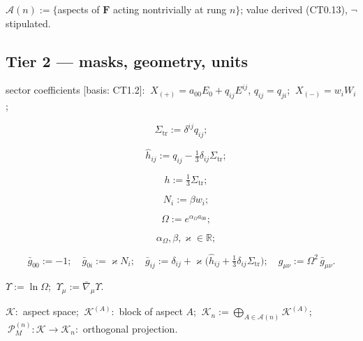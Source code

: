 \begin{definition}[{\texorpdfstring{D1.12}{D1.12}}]\label{tag:D1-12}
$\mathcal A(n):=\{$aspects of $\mathbf F$ acting nontrivially at rung $n\}$; value derived (CT0.13), $\neg$ stipulated.

\end{definition}

\subsection[Tier 2 — masks, geometry, units]{\texorpdfstring{Tier 2 — masks, geometry, units}{Tier 2 - masks, geometry, units}}

\begin{definition}[{\texorpdfstring{D2.1}{D2.1}}]\label{tag:D2-1}
sector coefficients [basis: CT1.2]: $\ X_{(+)}=a_{00}E_0+q_{ij}E^{ij}$, $q_{ij}=q_{ji}$; $\ X_{(-)}=w_iW_i$;

\[
\Sigma_{\mathrm{tr}}:=\delta^{ij}q_{ij};
\]

\[
\quad \hat h_{ij}:=q_{ij}-\tfrac13\delta_{ij}\Sigma_{\mathrm{tr}};
\]

\[
\quad h:=\tfrac13\Sigma_{\mathrm{tr}};
\]

\[
\quad N_i:=\beta w_i;
\]

\[
\quad \Omega:=e^{\alpha_\Omega a_{00}};
\]

\[
\quad \alpha_\Omega,\beta,\varkappa\in\mathbb R;
\]

\[
\bar g_{00}:=-1;\quad
\bar g_{0i}:=\varkappa N_i;\quad
\bar g_{ij}:=\delta_{ij}+\varkappa\bigl(\hat h_{ij}+\tfrac13\delta_{ij}\Sigma_{\mathrm{tr}}\bigr);\quad
g_{\mu\nu}:=\Omega^2\,\bar g_{\mu\nu}.
\]

\end{definition}

\begin{definition}[{\texorpdfstring{D2.2}{D2.2}}]\label{tag:D2-2}
$\Upsilon:=\ln\Omega$; $\ \Upsilon_\mu:=\bar\nabla_\mu\Upsilon$.

\end{definition}

\begin{definition}[{\texorpdfstring{D2.3}{D2.3}}]\label{tag:D2-3}
$\mathcal K:$ aspect space; $\ \mathcal K^{(A)}:$ block of aspect $A$; $\ \mathcal K_n:=\bigoplus_{A\in\mathcal A(n)}\mathcal K^{(A)}$; $\ \mathcal P_M^{(n)}:\mathcal K\to\mathcal K_n:$ orthogonal projection.

\end{definition}

